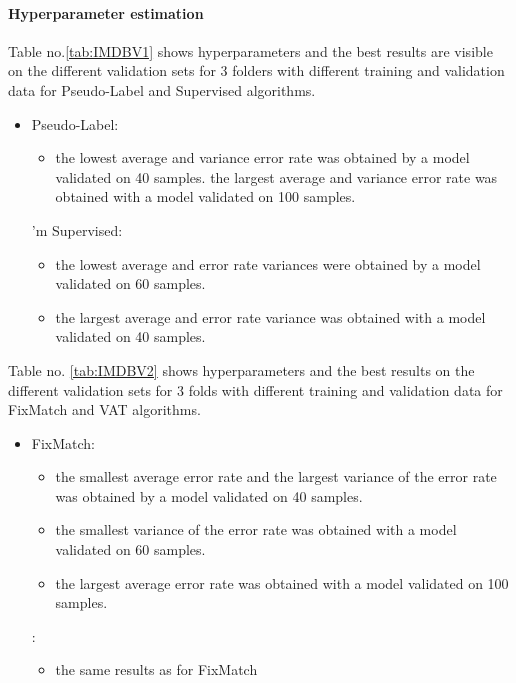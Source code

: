 \documentclass[12pt]{article}
\theoremstyle{definition}
\DeclareRobustCommand{\[}{\begin{equation}}
\DeclareRobustCommand{\]}{\end{equation}}
\begin{document}
\paragraph{Hyperparameter estimation}
\par Table no.\ref{tab:IMDBV1} shows hyperparameters and the best results are visible on the different validation sets for 3 folders with different training and validation data for Pseudo-Label and Supervised algorithms.
\begin{itemize}
    \item Pseudo-Label:
    \begin{itemize}
          \item the lowest average and variance error rate was obtained by a model validated on 40 samples.
          \itme the largest average and variance error rate was obtained with a model validated on 100 samples.
    \end{itemize}
    \I'm Supervised:
    \begin{itemize}
        \item the lowest average and error rate variances were obtained by a model validated on 60 samples.
        \item the largest average and error rate variance was obtained with a model validated on 40 samples.
    \end{itemize}
\end{itemize}


\par Table no. \ref{tab:IMDBV2} shows hyperparameters and the best results on the different validation sets for 3 folds with different training and validation data for FixMatch and VAT algorithms.
\begin{itemize}
    \item FixMatch:
    \begin{itemize}
        \item the smallest average error rate and the largest variance of the error rate was obtained by a model validated on 40 samples.
        \item the smallest variance of the error rate was obtained with a model validated on 60 samples.
        \item the largest average error rate was obtained with a model validated on 100 samples.
    \end{itemize}
    \VAT:
    \begin{itemize}
        \item the same results as for FixMatch
    \end{itemize}
\end{itemize}
\vspace{5mm} %
\vspace{5mm} %
\end{document}
